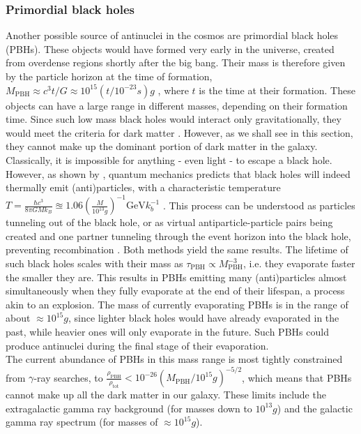 \subsubsection{Primordial black holes}
Another possible source of antinuclei in the cosmos are primordial black holes (PBHs). These objects would have formed very early in the universe, created from overdense regions shortly after the big bang. Their mass is therefore given by the particle horizon at the time of formation, $M_\mathrm{PBH} \approx c^3t/G \approx 10^{15} (t/10^{-23}s)g$ \cite{}, where $t$ is the time at their formation. These objects can have a large range in different masses, depending on their formation time. Since such low mass black holes would interact only gravitationally, they would meet the criteria for dark matter \cite{}. However, as we shall see in this section, they cannot make up the dominant portion of dark matter in the galaxy. \\
Classically, it is impossible for anything - even light - to escape a black hole. However, as shown by \cite{}, quantum mechanics predicts that black holes will indeed thermally emit (anti)particles, with a characteristic temperature $T = \frac{\hbar c^3}{8\pi GM k_B} \approxeq 1.06 \left( \frac{M}{10^{13}g}\right)^{-1} \mathrm{GeV} k_b^{-1}$ \cite{}. This process can be understood as particles tunneling out of the black hole\cite{}, or as virtual antiparticle-particle pairs being created and one partner tunneling through the event horizon into the black hole, preventing recombination \cite{}. Both methods yield the same results. The lifetime of such black holes scales with their mass as $\tau_\mathrm{PBH} \propto M_\mathrm{PBH}^{-3}$, i.e. they evaporate faster the smaller they are. This results in PBHs emitting many (anti)particles almost simultaneously when they fully evaporate at the end of their lifespan, a process akin to an explosion. The mass of currently evaporating PBHs is in the range of about $\approx 10^{15}g$, since lighter black holes would have already evaporated in the past, while heavier ones will only evaporate in the future. Such PBHs could produce antinuclei during the final stage of their evaporation. \\
The current abundance of PBHs in this mass range is most tightly constrained from $\gamma$-ray searches\cite{}, to $\frac{\rho_\mathrm{PBH}}{\rho_\mathrm{tot}} < 10^{-26} (M_\mathrm{PBH}/10^{15}g)^{-5/2}$, which means that PBHs cannot make up all the dark matter in our galaxy. These limits include the extragalactic gamma ray background (for masses down to $10^{13}g$) and the galactic gamma ray spectrum (for masses of $\approx 10^{15}g$).\\

